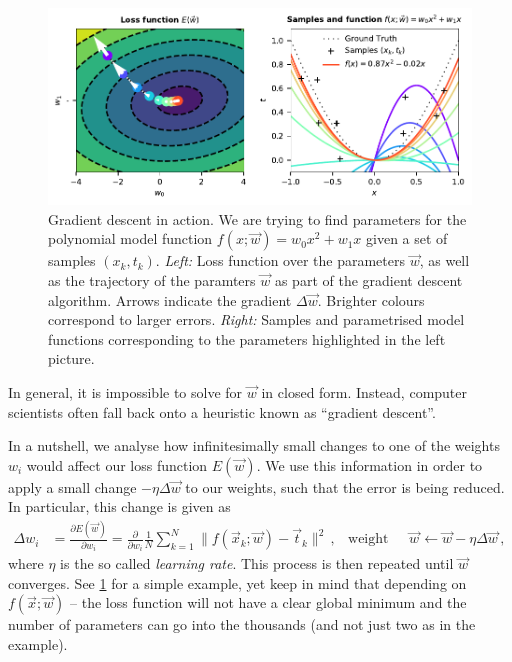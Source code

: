 \documentclass[10pt,letterpaper,oneside]{article}
\begin{document}
\begin{figure}
	\centering
	\includegraphics{media/gradient_descent_poly_example_10.pdf}
	\caption{Gradient descent in action. We are trying to find parameters for the polynomial model function $f(x; \vec w) = w_0 x^2 + w_1 x$ given a set of samples $(x_k, t_k)$. \emph{Left:} Loss function over the parameters $\vec w$, as well as the trajectory of the paramters $\vec w$ as part of the gradient descent algorithm. Arrows indicate the gradient $\Delta \vec w$. Brighter colours correspond to larger errors. \emph{Right:} Samples and parametrised model functions corresponding to the parameters highlighted in the left picture.}
	\label{fig:gradient_descent_poly_example_10}
\end{figure}

In general, it is impossible to solve for $\vec w$ in closed form. Instead, computer scientists often fall back onto a heuristic known as \enquote{gradient descent}.

In a nutshell, we analyse how infinitesimally small changes to one of the weights $w_i$ would affect our loss function $E(\vec w)$. We use this information in order to apply a small change $- \eta \Delta \vec w$ to our weights, such that the error is being reduced. In particular, this change is given as
\begin{align*}
	\Delta w_i &= \frac{\partial E(\vec w)}{\partial w_i} = \frac{\partial}{\partial w_i} \frac{1}{N} \sum_{k = 1}^N \big\| f(\vec x_k ; \vec w) - \vec t_k \big\|^2 \,, & \text{weight update step } \vec w &\gets \vec w - \eta \Delta \vec w \,,
\end{align*}
where $\eta$ is the so called \emph{learning rate}. This process is then repeated until $\vec w$ converges. See \cref{fig:gradient_descent_poly_example_10} for a simple example, yet keep in mind that depending on $f(\vec x; \vec w)$ -- the loss function will not have a clear global minimum and the number of parameters can go into the thousands (and not just two as in the example).
\end{document}
